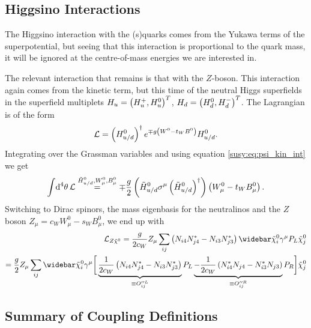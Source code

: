 \documentclass[../main.tex]{subfiles}
\begin{document}
\subsection{Higgsino Interactions}
The Higgsino interaction with the (s)quarks comes from the Yukawa terms of the
superpotential, but seeing that this interaction is proportional to the quark
mass, it will be ignored at the centre-of-mass energies we are interested in.

The relevant interaction that remains is that with the \(Z\)-boson. This
interaction again comes from the kinetic term, but this time of the neutral
Higgs superfields in the superfield multiplets \(H_u = \left(H_u^+,
  H_u^0\right)^T\), \(H_d = \left(H_d^0, H_d^-\right)^T\). The Lagrangian is of the form
\begin{equation}
  \mathcal{L} = \left(H_{u/d}^0\right)^\dagger e^{\mp g\left(W^0 - t_W B^0\right)} H_{u/d}^0.
\end{equation}
Integrating over the Grassman variables and using equation \cref{susy:eq:psi_kin_int} we get
\begin{equation}
  \integral{^4\theta} \L \stackrel{\tilde{H}_{u/d}^0, W^0_\mu, B^0_\mu}{=} \mp \frac{g}{2} \pclosed{\tilde{H}_{u/d}^0 \sigma\^\mu \pclosed{\tilde{H}_{u/d}^0}^\dagger}\pclosed{W^0_\mu - t_W B_\mu^0}.
\end{equation}
Switching to Dirac spinors, the mass eigenbasis for the neutralinos and the \(Z\) boson \(Z_\mu = c_W W^0_\mu - s_W B^0_\mu\), we end up with
\begin{align}
  \nonumber
  \L_{Z \tilde{\chi}^0} = \frac{g}{2c_W} Z_\mu \sum_{ij}\pclosed{N_{i4}N_{j4}^\ast - N_{i3}N_{j3}^\ast} \barnino[i] \gamma^\mu P_L \nino[j] \\
  = \frac{g}{2} Z_\mu \sum_{ij}\barnino[i] \gamma^\mu \bigg[ \underbrace{\frac{1}{2c_W}\pclosed{N_{i4}N_{j4}^\ast - N_{i3}N_{j3}^\ast}}_{\equiv O^{\prime\prime L}_{ij}} P_L \underbrace{-\frac{1}{2c_W}\pclosed{N_{i4}^\ast N_{j4} - N_{i3}^\ast N_{j3}}}_{\equiv O^{\prime\prime R}_{ij}} P_R \bigg] \nino[j]
\end{align}




\subsection{Summary of Coupling Definitions}
\end{document}
